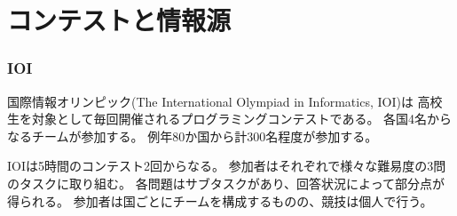 \section{コンテストと情報源}

\subsubsection{IOI}

\begin{comment}
The International Olympiad in Informatics (IOI)
is an annual programming contest for
secondary school students.
Each country is allowed to send a team of
four students to the contest.
There are usually about 300 participants
from 80 countries.

The IOI consists of two five-hour long contests.
In both contests, the participants are asked to
solve three algorithm tasks of various difficulty.
The tasks are divided into subtasks,
each of which has an assigned score.
Even if the contestants are divided into teams,
they compete as individuals.
\end{comment}

国際情報オリンピック(The International Olympiad in Informatics, IOI)は
高校生を対象として毎回開催されるプログラミングコンテストである。
各国4名からなるチームが参加する。
例年80か国から計300名程度が参加する。

IOIは5時間のコンテスト2回からなる。
参加者はそれぞれで様々な難易度の3問のタスクに取り組む。
各問題はサブタスクがあり、回答状況によって部分点が得られる。
参加者は国ごとにチームを構成するものの、競技は個人で行う。

\begin{comment}
The IOI syllabus \cite{iois} regulates the topics
that may appear in IOI tasks.
Almost all the topics in the IOI syllabus
are covered by this book.

Participants for the IOI are selected through
national contests.
Before the IOI, many regional contests are organized,
such as the Baltic Olympiad in Informatics (BOI),
the Central European Olympiad in Informatics (CEOI)
and the Asia-Pacific Informatics Olympiad (APIO).

Some countries organize online practice contests
for future IOI participants,
such as the Croatian Open Competition in Informatics \cite{coci}
and the USA Computing Olympiad \cite{usaco}.
In addition, a large collection of problems from Polish contests
is available online \cite{main}.
\end{comment}

